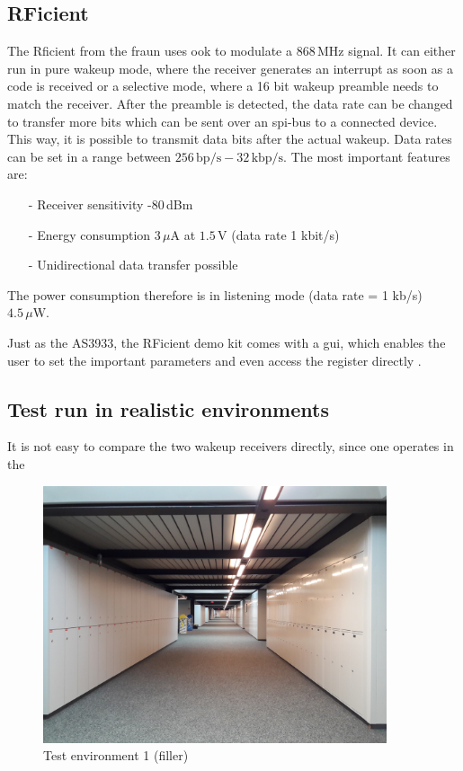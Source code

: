 \subsection{RFicient}
The Rficient from the \acs{fraun} uses \acs{ook} to modulate a 868\,MHz signal.
It can either run in pure wakeup mode, where the receiver generates an interrupt as soon as a code is received or a selective mode, where a 16 bit wakeup preamble needs to match the receiver. 
After the preamble is detected, the data rate can be changed to transfer more bits which can be sent over an \acs{spi}-bus to a connected device.
This way, it is possible to transmit data bits after the actual wakeup.
Data rates can be set in a range between $256\,\text{bp/s}-32\,\text{kbp/s}$.
The most important features are:
\begin{itemize}
	\item[-] Receiver sensitivity -80\,dBm
	\item[-] Energy consumption $3\,\mu\text{A}$ at $1.5\,\text{V}$ (data rate 1 kbit/s)
	\item[-] Unidirectional data transfer possible	
\end{itemize}
The power consumption therefore is in listening mode (data rate = 1 kb/s) $4.5\,\mu\text{W}$.

Just as the AS3933, the RFicient demo kit comes with a \acs{gui}, which enables the user to set the important parameters and even access the register directly \cite{rficient}.

\subsection{Test run in realistic environments}
It is not easy to compare the two wakeup receivers directly, since one operates in the 

\begin{figure}[ht]
	\centering
	\includegraphics[width=0.9\textwidth]{3-evaluation/graphics/env1.jpg}
	\caption{Test environment 1 (filler)\label{evaluation:env1}}
\end{figure}


